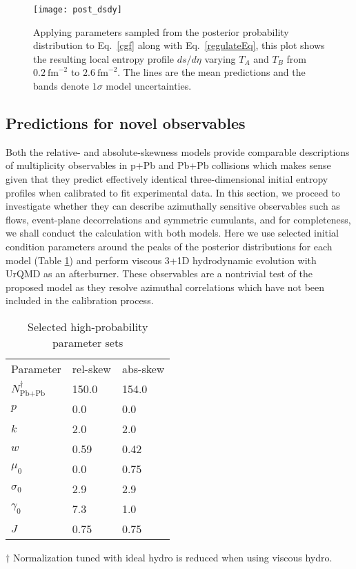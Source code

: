 \begin{figure}
  \texttt{[image: post\_dsdy]}
  \caption{Applying parameters sampled from the posterior probability distribution to Eq.~\eqref{cgf} along with Eq.~\eqref{regulateEq}, this plot shows the resulting local entropy profile $ds/d\eta$ varying $T_A$ and $T_B$ from $0.2~\text{fm}^{-2}$ to $2.6~\text{fm}^{-2}$. The lines are the mean predictions and the bands denote $1\sigma$ model uncertainties.
  }
  \label{fig:post_dsdy}
\end{figure}


\subsection{Predictions for novel observables}
Both the relative- and absolute-skewness models provide comparable descriptions of multiplicity observables in p+Pb and Pb+Pb collisions which makes sense given that they predict effectively identical three-dimensional initial entropy profiles when calibrated to fit experimental data.
In this section, we proceed to investigate whether they can describe azimuthally sensitive observables such as flows, event-plane decorrelations and symmetric cumulants, and for completeness, we shall conduct the calculation with both models.
Here we use selected initial condition parameters around the peaks of the posterior distributions for each model (Table \ref{tab:chosen_parameters}) and perform viscous 3+1D hydrodynamic evolution with UrQMD as an afterburner.
These observables are a nontrivial test of the proposed model as they resolve azimuthal correlations which have not been included in the calibration process.

\begin{table}[t]
  \caption{Selected high-probability parameter sets}
    \begin{tabular}{lll}
      Parameter & rel-skew	& abs-skew \\
      \paddedhline
      $N_{\textrm{Pb+Pb}}^\dagger$   & 150.0     & 154.0  \\
      $p$	    & 0.0      & 0.0  \\
      $k$	    & 2.0     & 2.0  \\
      $w$	    & 0.59     & 0.42  \\
      $\mu_0$   & 0.0     & 0.75  \\
      $\sigma_0$ & 2.9    & 2.9  \\
   	  $\gamma_0$ & 7.3		& 1.0	\\
      $J$	     & 0.75 & 0.75	\\
    \end{tabular}
  \raggedright{$\dagger$ Normalization tuned with ideal hydro is reduced when using viscous hydro.}
  \label{tab:chosen_parameters}
\end{table}

